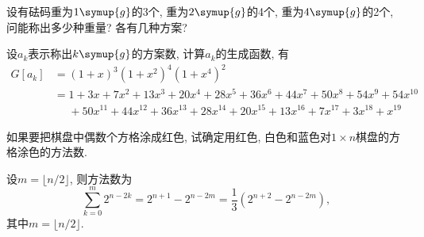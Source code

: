 \documentclass[chinese]{assignment}[2019/10/15]
\newcommand{\lr}[3]{\left#1#3\right#2}
\begin{document}
    \begin{problem}
        设有砝码重为$1\symup{g}$的3个, 重为$2\symup{g}$的4个, 重为$4\symup{g}$的2个, 问能称出多少种重量? 各有几种方案?
    \end{problem}
    \begin{solution}
        设$a_k$表示称出$k\symup{g}$的方案数, 计算$a_k$的生成函数, 有
        \begin{equation}
            \begin{aligned}
                G[a_k]
                &= (1+x)^3(1+x^2)^4(1+x^4)^2\\
                &= 1+3x+7x^2+13x^3+20x^4+28x^5+36x^6+44x^7+50x^8+54x^9+54x^{10}\\
                &\phantom{{}={}} +50x^{11}+44x^{12}+36x^{13}+28x^{14}+20x^{15}+13x^{16}+7x^{17}+3x^{18}+x^{19}
            \end{aligned}
        \end{equation}
    \end{solution}

    \begin{problem}
        如果要把棋盘中偶数个方格涂成红色, 试确定用红色, 白色和蓝色对$1\times n$棋盘的方格涂色的方法数.
    \end{problem}
    \begin{solution}
        设$m=\lfloor n/2\rfloor$, 则方法数为
        \begin{equation}
            \sum_{k = 0}^m2^{n-2k} = 2^{n+1} - 2^{n-2m} = \frac{1}{3}\lr(){2^{n+2}-2^{n-2m}},
        \end{equation}
        其中$m=\lfloor n/2\rfloor$.
    \end{solution}
\end{document}
